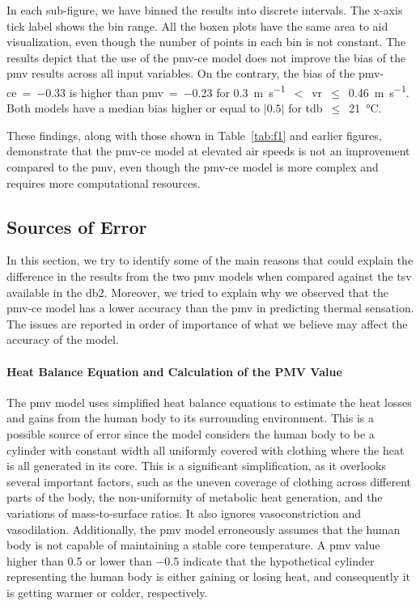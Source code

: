 In each sub-figure, we have binned the results into discrete intervals.
The x-axis tick label shows the bin range.
All the boxen plots have the same area to aid visualization, even though the number of points in each bin is not constant.
The results depict that the use of the \ac{pmv-ce} model does not improve the bias of the \ac{pmv} results across all input variables.
On the contrary, the bias of the \ac{pmv-ce}~=~\num{-.33} is higher than \ac{pmv}~=~\num{-0.23} for \qty{0.3}{\m\per\s}~$<$~\ac{vr}~$\leq$~\qty{0.46}{\m\per\s}.
Both models have a median bias higher or equal to $\lvert0.5\lvert$ for \ac{tdb}~$\leq$~\qty{21}{\celsius}.

These findings, along with those shown in Table~\ref{tab:f1} and earlier figures, demonstrate that the \ac{pmv-ce} model at elevated air speeds is not an improvement compared to the \ac{pmv}, even though the \ac{pmv-ce} model is more complex and requires more computational resources.

\subsection{Sources of Error}\label{subsec:sources-of-error}
In this section, we try to identify some of the main reasons that could explain the difference in the results from the two \ac{pmv} models when compared against the \ac{tsv} available in the \ac{db2}.
Moreover, we tried to explain why we observed that the \ac{pmv-ce} model has a lower accuracy than the \ac{pmv} in predicting thermal sensation.
The issues are reported in order of importance of what we believe may affect the accuracy of the model.

\paragraph{Heat Balance Equation and Calculation of the PMV Value}
The \ac{pmv} model uses simplified heat balance equations to estimate the heat losses and gains from the human body to its surrounding environment.
This is a possible source of error since the model considers the human body to be a cylinder with constant width all uniformly covered with clothing where the heat is all generated in its core.
This is a significant simplification, as it overlooks several important factors, such as the uneven coverage of clothing across different parts of the body, the non-uniformity of metabolic heat generation, and the variations of mass-to-surface ratios.
It also ignores vasoconstriction and vasodilation.
Additionally, the \ac{pmv} model erroneously assumes that the human body is not capable of maintaining a stable core temperature.
A \ac{pmv} value higher than \num{.5} or lower than \num{-.5} indicate that the hypothetical cylinder representing the human body is either gaining or losing heat, and consequently it is getting warmer or colder, respectively.

